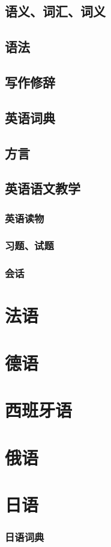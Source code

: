 \documentclass[UTF8]{../../RepresentationUniverse}
\begin{document}
    \subsection{语义、词汇、词义}
    \subsection{语法}
    \subsection{写作修辞}
    \subsection{英语词典}
    \subsection{方言}
    \subsection{英语语文教学}
        \subsubsection{英语读物}
        \subsubsection{习题、试题}
        \subsubsection{会话}
\section{法语}
\section{德语}
\section{西班牙语}
\section{俄语}
\section{日语}
    \subsubsection{日语词典}
\end{document}
